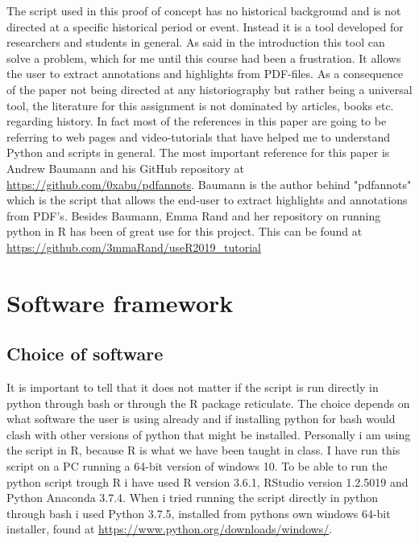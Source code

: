 \documentclass{article}
\begin{document}
The script used in this proof of concept has no historical background and is not directed at a specific historical period or event. Instead it is a tool developed for researchers and students in general. As said in the introduction this tool can solve a problem, which for me until this course had been a frustration. It allows the user to extract annotations and highlights from PDF-files.
As a consequence of the paper not being directed at any historiography but rather being a universal tool, the literature for this assignment is not dominated by articles, books etc. regarding history. In fact most of the references in this paper are going to be referring to web pages and video-tutorials that have helped me to understand Python and scripts in general.
The most important reference for this paper is Andrew Baumann and his GitHub repository at \url{https://github.com/0xabu/pdfannots}. Baumann is the author behind "pdfannots" which is the script that allows the end-user to extract highlights and annotations from PDF's. Besides Baumann, Emma Rand and her repository on running python in R has been of great use for this project. This can be found at \url{https://github.com/3mmaRand/useR2019_tutorial}

\section{Software framework}
\subsection{Choice of software}
It is important to tell that it does not matter if the script is run directly in python through bash or through the R package reticulate. The choice depends on what software the user is using already and if installing python for bash would clash with other versions of python that might be installed. Personally i am using the script in R, because R is what we have been taught in class. I have run this script on a PC running a 64-bit version of windows 10. To be able to run the python script trough R i have used R version 3.6.1, RStudio version 1.2.5019 and Python Anaconda 3.7.4. When i tried running the script directly in python through bash i used Python 3.7.5, installed from pythons own windows 64-bit installer, found at \url{https://www.python.org/downloads/windows/}.
\end{document}
